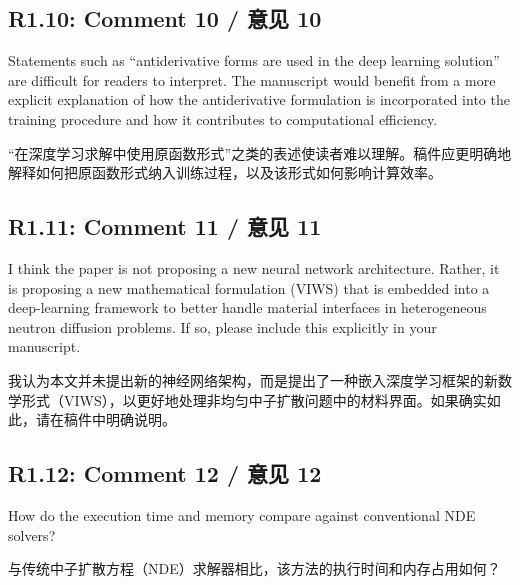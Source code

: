 \documentclass[11pt,a4paper,twoside]{article}
\begin{document}
\subsection{R1.10: Comment 10 / 意见 10}
\begin{englishcomment}
Statements such as ``antiderivative forms are used in the deep learning solution'' are difficult for readers to interpret. The manuscript would benefit from a more explicit explanation of how the antiderivative formulation is incorporated into the training procedure and how it contributes to computational efficiency.
\end{englishcomment}
\begin{chinesecomment}
“在深度学习求解中使用原函数形式”之类的表述使读者难以理解。稿件应更明确地解释如何把原函数形式纳入训练过程，以及该形式如何影响计算效率。
\end{chinesecomment}
\begin{revisionidea}
\end{revisionidea}

\subsection{R1.11: Comment 11 / 意见 11}
\begin{englishcomment}
I think the paper is not proposing a new neural network architecture. Rather, it is proposing a new mathematical formulation (VIWS) that is embedded into a deep-learning framework to better handle material interfaces in heterogeneous neutron diffusion problems. If so, please include this explicitly in your manuscript.
\end{englishcomment}
\begin{chinesecomment}
我认为本文并未提出新的神经网络架构，而是提出了一种嵌入深度学习框架的新数学形式（VIWS），以更好地处理非均匀中子扩散问题中的材料界面。如果确实如此，请在稿件中明确说明。
\end{chinesecomment}
\begin{revisionidea}
\end{revisionidea}

\subsection{R1.12: Comment 12 / 意见 12}
\begin{englishcomment}
How do the execution time and memory compare against conventional NDE solvers?
\end{englishcomment}
\begin{chinesecomment}
与传统中子扩散方程（NDE）求解器相比，该方法的执行时间和内存占用如何？
\end{chinesecomment}
\begin{revisionidea}
\end{revisionidea}
\end{document}
